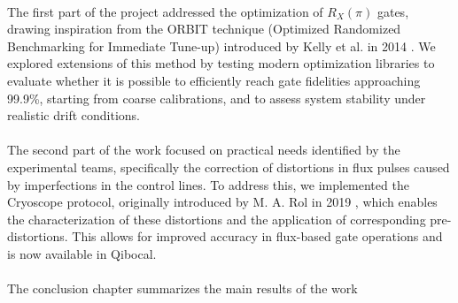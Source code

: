 \paragraph{}
The first part of the project addressed the optimization of $R_X(\pi)$ gates, drawing inspiration from the ORBIT technique (Optimized Randomized Benchmarking for Immediate Tune-up) introduced by Kelly et al. in 2014 \cite{kelly_optimal_2014}. 
We explored extensions of this method by testing modern optimization libraries to evaluate whether it is possible to efficiently reach gate fidelities approaching 99.9\%, starting from coarse calibrations, and to assess system stability under realistic drift conditions.

\paragraph{}
The second part of the work focused on practical needs identified by the experimental teams, specifically the correction of distortions in flux pulses caused by imperfections in the control lines. 
To address this, we implemented the Cryoscope protocol, originally introduced by M. A. Rol in 2019 \cite{rol_time-domain_2020}, which enables the characterization of these distortions and the application of corresponding pre-distortions. This allows for improved accuracy in flux-based gate operations and is now available in Qibocal.

\paragraph{}
The conclusion chapter summarizes the main results of the work